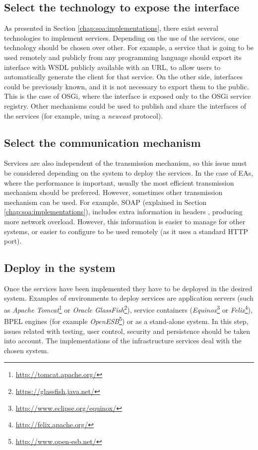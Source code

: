 \subsection{Select the technology to expose the interface}
As presented in Section \ref{chap:soa:implementations}, there exist several technologies to implement services. Depending on the use of the services, one technology should be chosen over other. For example, a service that is going to be used remotely and publicly from any programming language should export its interface with WSDL publicly available with an URL, to allow users to automatically generate the client for that service. On the other side, interfaces could be previously known, and it is not necessary to export them to the public. This is the case of OSGi, where the interface is exposed only to the OSGi service registry. Other mechanisms could be used to publish and share the interfaces of the services (for example, using a {\em newcast} protocol).

\subsection{Select the communication mechanism}
Services are also independent of the transmission mechanism, so this issue must be considered depending on the system to deploy the services. In the case of EAs, where the performance is important, usually the most efficient transmission mechanism should be preferred. However, sometimes other transmission mechanism can be used. For example, SOAP (explained in Section \ref{chap:soa:implementations}), includes extra information in headers \cite{Castillo13SOAP}, producing more network overload. However, this information is easier to manage for other systems, or easier to configure to be used remotely (as it uses a standard HTTP port).

\subsection{Deploy in the system} 
Once the services have been implemented they have to be deployed in the desired system. Examples of environments to deploy services are application servers (such as {\em Apache Tomcat}\footnote{\url{http://tomcat.apache.org/}} or {\em Oracle GlassFish}\footnote{\url{https://glassfish.java.net/}}), service containers ({\em Equinox}\footnote{\url{http://www.eclipse.org/equinox/}} or {\em Felix}\footnote{\url{http://felix.apache.org/}}), BPEL engines (for example {\em OpenESB}\footnote{\url{http://www.open-esb.net/}}) or as a stand-alone system. In this step, issues related with testing, user control, security and persistence should be taken into account. The implementations of the infrastructure services deal with the chosen system.




